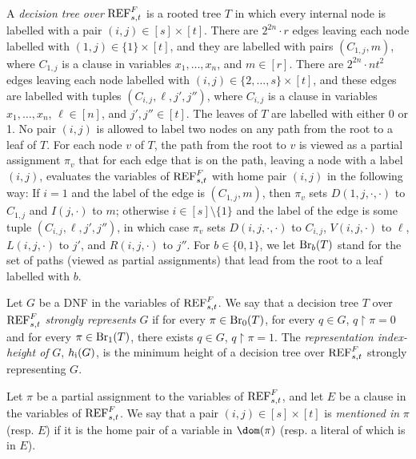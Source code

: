 \begin{definition}
\label{def:decision-tree-for-REF-F-s-t}
A \emph{decision tree over} $\textnormal{REF}^{F}_{s,t}$ is a rooted tree $T$ in which every internal node is labelled with a pair $(i,j) \in [s] \times [t]$. There are $2^{2n} \cdot r$ edges leaving each node labelled with $(1,j) \in \{1\} \times [t]$, and they are labelled with pairs $(C_{1,j}, m)$, where $C_{1,j}$ is a clause in variables $x_1, \ldots, x_n$, and $m \in [r]$. There are $2^{2n} \cdot nt^2$ edges leaving each node labelled with $(i,j) \in \{2, \ldots, s\} \times [t]$, and these edges are labelled with tuples $(C_{i,j}, \ell, j', j'')$, where $C_{i,j}$ is a clause in variables $x_1, \ldots, x_n$, $\ell \in [n]$, and $j',j'' \in [t]$. 
The leaves of $T$ are labelled with either 0 or 1. No pair $(i,j)$ is allowed to label two nodes on any path from the root to a leaf of $T$. For each node $v$ of $T$, the path from the root to $v$ is viewed as a partial assignment $\pi_v$ that for each edge that is on the path, leaving a node  with a label $(i,j)$, evaluates the variables of $\textnormal{REF}^{F}_{s,t}$ with home pair $(i,j)$ in the following way: If $i=1$ and the label of the edge is $(C_{1,j}, m)$, then $\pi_v$ sets $D(1,j,\cdot, \cdot)$ to $C_{1,j}$ and $I(j, \cdot)$ to $m$; otherwise $i \in [s] \setminus \{1\}$ and the label of the edge is some tuple $(C_{i,j}, \ell, j', j'')$, in which case $\pi_v$ sets $D(i,j,\cdot, \cdot)$ to $C_{i,j}$, $V(i,j,\cdot)$ to $\ell$, $L(i,j,\cdot)$ to $j'$, and $R(i,j,\cdot)$ to $j''$.
For $b \in \{0,1\}$, we let $\textnormal{Br}_b(T)$ stand for the set of paths (viewed as partial assignments) that lead from the root to a leaf labelled with $b$. 
\end{definition}

\begin{definition}
\label{def:strongly-represents-and-index-height}
Let $G$ be a DNF in the variables of $\textnormal{REF}^{F}_{s,t}$. We say that a decision tree $T$ over $\textnormal{REF}^{F}_{s,t}$ \emph{strongly represents} $G$ if for every $\pi \in \textnormal{Br}_0(T)$, for every $q \in G$, $q \! \restriction \! \pi = 0$ and for every $\pi \in \textnormal{Br}_1(T)$, there exists $q \in G$, $q \! \restriction \! \pi = 1$. The \emph{representation index-height of} $G$, $h_{\textnormal{i}}(G)$, is the minimum height of a decision tree over $\textnormal{REF}^{F}_{s,t}$ strongly representing $G$.
\end{definition}

\begin{definition}
\label{def:mentioned}
Let $\pi$ be a partial assignment to the variables of $\textnormal{REF}^{F}_{s,t}$, and let $E$ be a clause in the variables of $\textnormal{REF}^F_{s,t}$. We say that a pair $(i,j) \in [s] \times [t]$ is \emph{mentioned in} $\pi$ (resp. $E$) if it is the home pair of a variable in $\dom(\pi)$ (resp. a literal of which is in $E$).
\end{definition}


